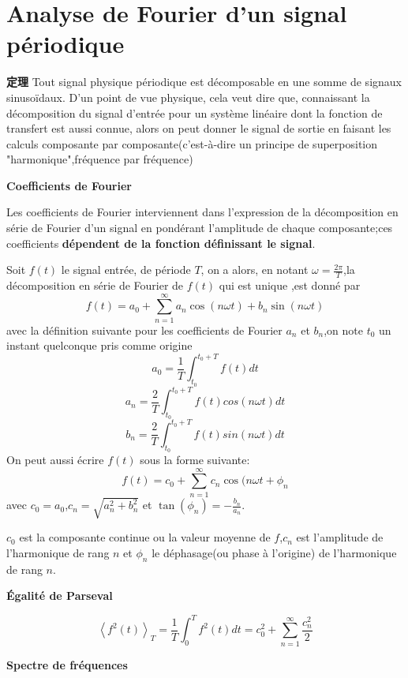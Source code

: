 \documentclass[12pt]{book}
\theoremstyle{definition}\newtheorem{dfn}{Définition}[chapter]
\theoremstyle{plain}\newtheorem{thm}{Théorème}[chapter]
\theoremstyle{plain}\newtheorem{prp}{Proposition}[chapter]
\theoremstyle{plain}\newtheorem{lem}{\bf Lemme}[chapter]
\theoremstyle{plain}\newtheorem{axm}{\bf Axiome}[chapter]
\theoremstyle{plain}\newtheorem{lmm}{\bf Lemme}[chapter]
\theoremstyle{plain}\newtheorem{cor}{\bf Corollaire}[chapter]
\theoremstyle{remark}\newtheorem{rem}{Remarque}[chapter]
\begin{document}
\chapter{Analyse de Fourier d'un signal périodique}
\begin{framed}{\textbf{定理}}
Tout signal physique périodique est décomposable en une somme de signaux sinusoïdaux.
D'un point de vue physique, cela veut dire que, connaissant {\color{red}la décomposition du signal d'entrée} pour un système linéaire dont {\color{red}la fonction de transfert} est aussi connue, alors on peut donner {\color{red}le signal de sortie} en faisant les calculs composante par composante(c'est-à-dire un principe de superposition "harmonique",fréquence par fréquence)
\end{framed}
\textbf{Coefficients de Fourier}

Les coefficients de Fourier interviennent dans l'expression de la décomposition en série de Fourier d'un signal en pondérant l'amplitude de chaque composante;ces coefficients \textbf{dépendent de la fonction définissant le signal}.

Soit $f(t)$ le signal entrée, de période $T$, on a alors, en notant $\omega=\frac{2\pi}{T}$,la décomposition en série de Fourier de $f(t)$ qui est unique ,est donné par 
$$
\boxed{f(t)=a_0+\sum_{n=1}^{\infty}a_n\cos(n\omega t)+b_n\sin(n\omega t)}
$$
avec la définition suivante pour les coefficients de Fourier $a_n$ et $b_n$,on note $t_0$ un instant quelconque pris comme origine
$$
\boxed{a_0=\frac{1}{T}\int_{t_0}^{t_0+T}f(t)dt}
$$  
$$
\boxed{a_n=\frac{2}{T}\int_{t_0}^{t_0+T}f(t)cos(n\omega t)dt}
$$
$$
\boxed{b_n=\frac{2}{T}\int_{t_0}^{t_0+T}f(t)sin(n\omega t)dt}
$$
On peut aussi écrire $f(t)$ sous la forme suivante:
$$
\boxed{f(t)=c_0+\sum_{n=1}^{\infty}c_n\cos(n\omega t+\phi_{n}}
$$
avec $c_0=a_0$,$c_n=\sqrt{a_n^2+b_n^2}$ et $\tan(\phi_{n})=-\frac{b_n}{a_n}$.

$c_0$ est la composante continue ou la valeur moyenne de $f$,$c_n$ est l'amplitude de l'harmonique de rang $n$ et $\phi_{n}$ le déphasage(ou phase à l'origine) de l'harmonique de rang $n$.

\textbf{Égalité de Parseval}

$$
\boxed{\left \langle f^2(t) \right \rangle _{T}=\frac{1}{T}\int_{0}^{T}f^2(t)dt=c_0^2+\sum_{n=1}^{\infty}\frac{c_n^2}{2}}
$$



\textbf{Spectre de fréquences}
\end{document}
